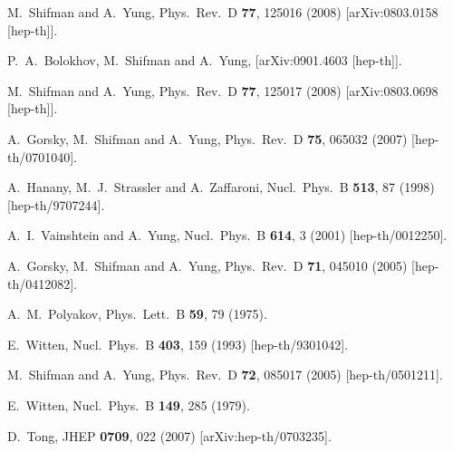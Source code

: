 \documentclass[12pt]{article}
\begin{document}
\begin{thebibliography}{99}
  M.~Shifman and A.~Yung,
  Phys.\ Rev.\  D {\bf 77}, 125016 (2008)
  [arXiv:0803.0158 [hep-th]].
     
          
  P.~A.~Bolokhov, M.~Shifman and A.~Yung,
  [arXiv:0901.4603 [hep-th]].
  
M.~Shifman and A.~Yung,
  Phys.\ Rev.\  D {\bf 77}, 125017 (2008)
  [arXiv:0803.0698 [hep-th]].


A.~Gorsky, M.~Shifman and A.~Yung,
Phys.\ Rev.\  D {\bf 75}, 065032 (2007)
  [hep-th/0701040].

A.~Hanany, M.~J.~Strassler and A.~Zaffaroni,
Nucl.\ Phys.\ B {\bf 513}, 87 (1998)
[hep-th/9707244].

A.~I.~Vainshtein and A.~Yung,
Nucl.\ Phys.\ B {\bf 614}, 3 (2001)
[hep-th/0012250].

A.~Gorsky, M.~Shifman and A.~Yung,
  Phys.\ Rev.\ D {\bf 71}, 045010 (2005)
  [hep-th/0412082].

A.~M.~Polyakov,
Phys.\ Lett.\ B {\bf 59}, 79 (1975).

E.~Witten,
  Nucl.\ Phys.\ B {\bf 403}, 159 (1993)
  [hep-th/9301042].



M.~Shifman and A.~Yung,
Phys.\ Rev.\ D {\bf 72}, 085017 (2005)
[hep-th/0501211].

E.~Witten,
Nucl.\ Phys.\ B {\bf 149}, 285 (1979).

  D.~Tong,
  JHEP {\bf 0709}, 022 (2007)
  [arXiv:hep-th/0703235].


\end{thebibliography}
\end{document}
